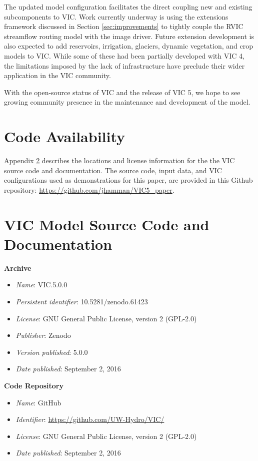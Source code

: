 \documentclass[gmd, manuscript]{copernicus}
\begin{document}
  The updated model configuration facilitates the direct coupling new and existing subcomponents to VIC.
  Work currently underway is using the extensions framework discussed in Section \ref{sec:improvements} to tightly couple the RVIC streamflow routing model with the image driver.
  Future extension development is also expected to add reservoirs, irrigation, glaciers, dynamic vegetation, and crop models to VIC.
  While some of these had been partially developed with VIC 4, the limitations imposed by the lack of infrastructure have preclude their wider application in the VIC community.

  With the open-source status of VIC and the release of VIC 5, we hope to see growing community presence in the maintenance and development of the model.

\section{Code Availability}
\label{appendix:code_avail}

  Appendix \ref{appendix:source_code} describes the locations and license information for the the VIC source code and documentation.
  The source code, input data, and VIC configurations used as demonstrations for this paper, are provided in this Github repository: \url{https://github.com/jhamman/VIC5_paper}.

\appendix
\section{VIC Model Source Code and Documentation}
\label{appendix:source_code}
{\bf Archive}

\begin{itemize}
	\item \textit{Name}: VIC.5.0.0
	\item \textit{Persistent identifier}: 10.5281/zenodo.61423
	\item \textit{License}: GNU General Public License, version 2 (GPL-2.0)
	\item \textit{Publisher}:  Zenodo
	\item \textit{Version published}: 5.0.0
	\item \textit{Date published}: September 2, 2016
\end{itemize}

{\bf Code Repository}

\begin{itemize}
	\item \textit{Name}: GitHub
	\item \textit{Identifier}: \url{https://github.com/UW-Hydro/VIC/}
	\item \textit{License}: GNU General Public License, version 2 (GPL-2.0)
	\item \textit{Date published}: September 2, 2016
\end{itemize}
\end{document}
